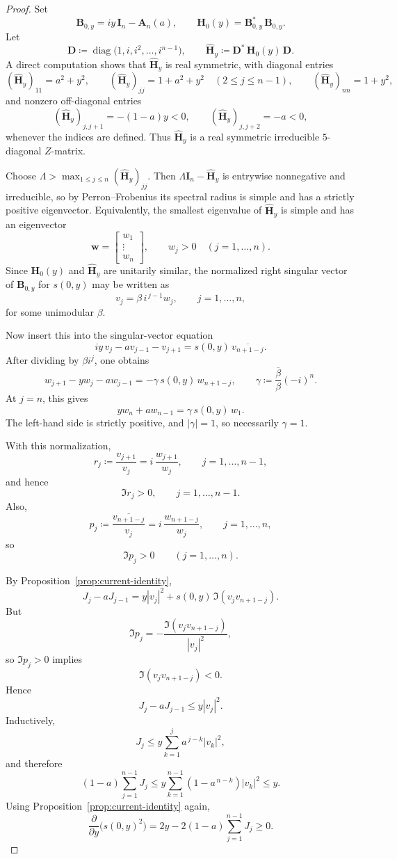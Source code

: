 \documentclass[11pt]{article}
\begin{document}
\begin{proof}
Set
\[
\mathbf B_{0,y}=iy\,\mathbf I_n-\mathbf A_n(a),
\qquad
\mathbf H_0(y)=\mathbf B_{0,y}^*\,\mathbf B_{0,y}.
\]
Let
\[
\mathbf D\coloneqq \operatorname{diag}\bigl(1,i,i^2,\dots,i^{n-1}\bigr),
\qquad
\widehat{\mathbf H}_y\coloneqq \mathbf D^*\,\mathbf H_0(y)\,\mathbf D.
\]
A direct computation shows that \(\widehat{\mathbf H}_y\) is real symmetric, with diagonal entries
\[
(\widehat{\mathbf H}_y)_{11}=a^2+y^2,
\qquad
(\widehat{\mathbf H}_y)_{jj}=1+a^2+y^2\quad (2\le j\le n-1),
\qquad
(\widehat{\mathbf H}_y)_{nn}=1+y^2,
\]
and nonzero off-diagonal entries
\[
(\widehat{\mathbf H}_y)_{j,j+1}=-(1-a)y<0,
\qquad
(\widehat{\mathbf H}_y)_{j,j+2}=-a<0,
\]
whenever the indices are defined. Thus \(\widehat{\mathbf H}_y\) is a real symmetric irreducible \(5\)-diagonal \(Z\)-matrix.

Choose \(\Lambda>\max_{1\le j\le n}(\widehat{\mathbf H}_y)_{jj}\). Then \(\Lambda\mathbf I_n-\widehat{\mathbf H}_y\) is entrywise nonnegative and irreducible, so by Perron--Frobenius its spectral radius is simple and has a strictly positive eigenvector. Equivalently, the smallest eigenvalue of \(\widehat{\mathbf H}_y\) is simple and has an eigenvector
\[
\mathbf w=
\begin{bmatrix}
w_1\\
\vdots\\
w_n
\end{bmatrix},
\qquad
w_j>0\quad (j=1,\dots,n).
\]
Since \(\mathbf H_0(y)\) and \(\widehat{\mathbf H}_y\) are unitarily similar, the normalized right singular vector of \(\mathbf B_{0,y}\) for \(s(0,y)\) may be written as
\[
v_j=\beta\,i^{\,j-1}w_j,
\qquad
j=1,\dots,n,
\]
for some unimodular \(\beta\).

Now insert this into the singular-vector equation
\[
iy\,v_j-a v_{j-1}-v_{j+1}=s(0,y)\,\overline{v_{n+1-j}}.
\]
After dividing by \(\beta i^j\), one obtains
\[
w_{j+1}-y w_j-a w_{j-1}=-\gamma\,s(0,y)\,w_{n+1-j},
\qquad
\gamma\coloneqq \frac{\overline\beta}{\beta}(-i)^n.
\]
At \(j=n\), this gives
\[
y w_n+a w_{n-1}=\gamma\,s(0,y)\,w_1.
\]
The left-hand side is strictly positive, and \(|\gamma|=1\), so necessarily \(\gamma=1\).

With this normalization,
\[
r_j\coloneqq \frac{v_{j+1}}{v_j}=i\,\frac{w_{j+1}}{w_j},
\qquad
j=1,\dots,n-1,
\]
and hence
\[
\Im r_j>0,
\qquad
j=1,\dots,n-1.
\]
Also,
\[
p_j\coloneqq \frac{\overline{v_{n+1-j}}}{v_j}=i\,\frac{w_{n+1-j}}{w_j},
\qquad
j=1,\dots,n,
\]
so
\[
\Im p_j>0
\qquad
(j=1,\dots,n).
\]

By Proposition~\ref{prop:current-identity},
\[
J_j-aJ_{j-1}=y|v_j|^2+s(0,y)\,\Im(v_jv_{n+1-j}).
\]
But
\[
\Im p_j
=
-\frac{\Im(v_jv_{n+1-j})}{|v_j|^2},
\]
so \(\Im p_j>0\) implies
\[
\Im(v_jv_{n+1-j})<0.
\]
Hence
\[
J_j-aJ_{j-1}\le y|v_j|^2.
\]
Inductively,
\[
J_j\le y\sum_{k=1}^j a^{\,j-k}|v_k|^2,
\]
and therefore
\[
(1-a)\sum_{j=1}^{n-1}J_j
\le
y\sum_{k=1}^{n-1}(1-a^{\,n-k})|v_k|^2
\le
y.
\]
Using Proposition~\ref{prop:current-identity} again,
\[
\frac{\partial}{\partial y}\bigl(s(0,y)^2\bigr)
=
2y-2(1-a)\sum_{j=1}^{n-1}J_j
\ge 0.
\]
\end{proof}
\end{document}
